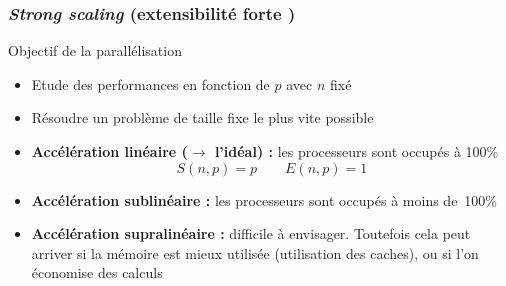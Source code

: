\documentclass[xcolor={x11names,svgnames}]{beamer}
\begin{document}
\begin{frame}
\frametitle{\emph{Strong scaling} (\og extensibilité forte \fg)}

\begin{alertblock}{Objectif de la parallélisation}
  \begin{itemize}
  \item Etude des performances en fonction de $p$ avec $n$ fixé
  \item Résoudre un problème de taille fixe le plus vite possible
  \end{itemize}
\end{alertblock}

\medskip

\begin{itemize} 
\item  {\bf Accélération linéaire ($\rightarrow$ l'idéal) :} 
les processeurs sont occupés à 100\% 
\[S(n,p)  = p \qquad E(n,p)  = 1\]

\medskip

\item {\bf Accélération sublinéaire :}
les processeurs sont occupés à moins de~100\% 

\medskip

\item {\bf Accélération supralinéaire :} difficile à envisager.
Toutefois cela peut arriver si la mémoire est mieux utilisée
(utilisation des caches), ou si l'on économise des calculs


\end{itemize}
\end{frame}
\end{document}
